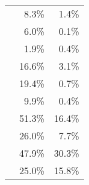 \begin{table}[!tbp]
\begin{tabular}{lrr}
\eeTo{ \Pquark \Pquark} & 8.3\%& 1.4\%\\
\eeTo{ \Pquark \Pquark \Plepton \Pnu} & 6.0\%& 0.1\%\\
\eeTo{ \Pquark \Pquark \Pl \Pl} & 1.9\%& 0.4\%\\
\eeTo{ \Pquark \Pquark \Pnu \Pnu} & 16.6\%& 3.1\% \\
\hline
\egamma{\Pepm}{\Pphoton}{\BS}{\Pepm \Pquark \Pquark \Pquark \Pquark}& 19.4\%& 0.7\%\\
\egamma{\Pepm}{\Pphoton}{\EPA}{\Pepm \Pquark \Pquark \Pquark \Pquark} & 9.9\%& 0.4\%\\
\egamma{\Pepm}{\Pphoton}{\BS}{\Pnu \Pquark \Pquark \Pquark \Pquark} & 51.3\%& 16.4\%\\
\egamma{\Pepm}{\Pphoton}{\EPA}{\Pnu \Pquark \Pquark \Pquark \Pquark} & 26.0\%& 7.7\%\\
\egamma{\Pepm}{\Pphoton}{\BS}{\Pquark \Pquark \PHiggs \Pnu} &47.9\%& 30.3\% \\
\egamma{\Pem}{\Pphoton}{\EPA}{\Pquark \Pquark \PHiggs \Pnu} & 25.0\% & 15.8\% \\
\hline

\end{tabular}
\end{table}
